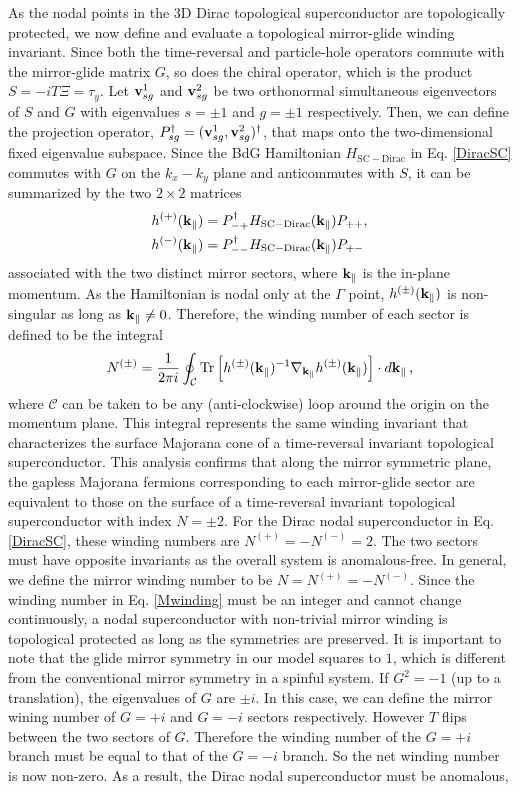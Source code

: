 As the nodal points in the $3$D Dirac topological superconductor are topologically protected, we now define and evaluate a topological mirror-glide winding invariant. Since both the time-reversal and particle-hole operators commute with the mirror-glide matrix $G$, so does the chiral operator, which is the product $S=-iT\Xi=\tau_y$. Let ${\bf v}_{sg}^1$ and ${\bf v}_{sg}^2$ be two orthonormal simultaneous eigenvectors of $S$ and $G$ with eigenvalues $s=\pm1$ and $g=\pm1$ respectively. Then, we can define the projection operator, $P_{sg}^\dagger=({\bf v}_{sg}^1,{\bf v}_{sg}^2)^\dagger$, that maps onto the two-dimensional fixed eigenvalue subspace. Since the BdG Hamiltonian $H_{\mathrm{SC-Dirac}}$ in Eq. \eqref{DiracSC} commutes with $G$ on the $k_x-k_y$ plane and anticommutes with $S$, it can be summarized by the two $2\times2$ matrices \begin{align}h^{(+)}({\bf k}_\|)&=P_{-+}^\dagger H_{\mathrm{SC-Dirac}}({\bf k}_\|)P_{++},\nonumber\\h^{(-)}({\bf k}_\|)&=P_{--}^\dagger H_{\mathrm{SC-Dirac}}({\bf k}_\|)P_{+-}\end{align} associated with the two distinct mirror sectors, where ${\bf k}_\|$ is the in-plane momentum. As the Hamiltonian is nodal only at the $\Gamma$ point, $h^{(\pm)}({\bf k}_\|)$ is non-singular as long as ${\bf k}_\|\neq0$. Therefore, the winding number of each sector is defined to be the integral \begin{align}N^{(\pm)}=\frac{1}{2\pi i}\oint_{\mathcal{C}}\mathrm{Tr}\left[h^{(\pm)}({\bf k}_\|)^{-1}\nabla_{{\bf k}_\|}h^{(\pm)}({\bf k}_\|)\right]\cdot d{\bf k}_\| \,, \label{Mwinding}\end{align} where $\mathcal{C}$ can be taken to be any (anti-clockwise) loop around the origin on the momentum plane. This integral represents the same winding invariant that characterizes the surface Majorana cone of a time-reversal invariant topological superconductor. This analysis confirms that along the mirror symmetric plane, the gapless Majorana fermions corresponding to each mirror-glide sector are equivalent to those on the surface of a time-reversal invariant topological superconductor with index $N=\pm2$\cite{Ryu2008}.  For the Dirac nodal superconductor in Eq. \eqref{DiracSC}, these winding numbers are $N^{(+)}=-N^{(-)}=2$. The two sectors must have opposite invariants as the overall system is anomalous-free. In general, we define the mirror winding number to be $N=N^{(+)}=-N^{(-)}$. Since the winding number in Eq. \eqref{Mwinding} must be an integer and cannot change continuously, a nodal superconductor with non-trivial mirror winding is topological protected as long as the symmetries are preserved. It is important to note that the glide mirror symmetry in our model squares to $1$, which is different from the conventional mirror symmetry in a spinful system. If $G^2=-1$ (up to a translation), the eigenvalues of $G$ are $\pm i$. In this case, we can define the mirror wining number of $G=+i$ and $G=-i$ sectors respectively. However $T$ flips between the two sectors of $G$. Therefore the winding number of the $G=+i$ branch must be equal to that of the $G=-i$ branch. So the net winding number is now non-zero. As a result, the Dirac nodal superconductor must be anomalous, 